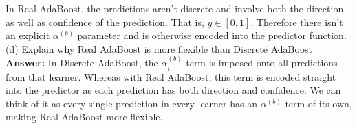 \documentclass[11pt]{article}
\begin{document}
    In Real AdaBoost, the predictions aren't discrete and involve both the direction as well as
    confidence of the prediction. That is, $y \in [0, 1]$. Therefore there isn't an explicit
    $\alpha^{(b)}$ parameter and is otherwise encoded into the predictor function. \\ 

    (d) Explain why Real AdaBoost is more flexible than Discrete AdaBoost \\ 

    \textbf{Answer:} In Discrete AdaBoost, the $\alpha^{(b)}_i$ term is imposed onto all 
    predictions from that learner. Whereas with Real AdaBoost, this term is encoded straight into
    the predictor as each prediction has both direction and confidence. We can think of it as every
    single prediction in every learner has an $\alpha^{(b)}$ term of its own, making Real AdaBoost
    more flexible.
\end{document}
